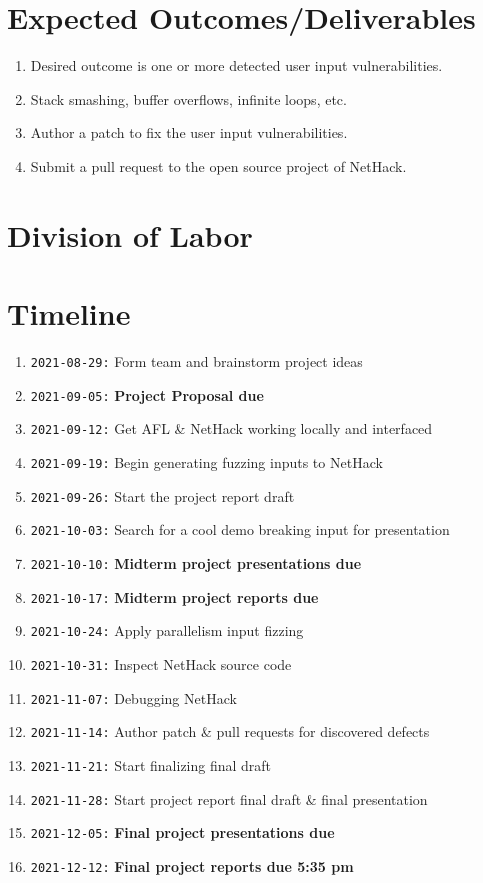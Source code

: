 \documentclass[12pt]{diazessay}
\begin{document}
\section*{Expected Outcomes/Deliverables}

\begin{enumerate}
  \item Desired outcome is one or more detected user input vulnerabilities.
  \item Stack smashing, buffer overflows, infinite loops, etc.
  \item Author a patch to fix the user input vulnerabilities.
  \item Submit a pull request to the open source project of NetHack.
\end{enumerate}


\section*{Division of Labor}


\section*{Timeline}

  \begin{enumerate}[label={}]
  	\item \texttt{2021-08-29:} Form team and brainstorm project ideas
  	\item \texttt{2021-09-05:} \textbf{Project Proposal due}
  	\item \texttt{2021-09-12:} Get AFL \& NetHack working locally and interfaced
 	\item \texttt{2021-09-19:} Begin generating fuzzing inputs to NetHack
  	\item \texttt{2021-09-26:} Start the project report draft
  	\item \texttt{2021-10-03:} Search for a cool demo breaking input for presentation
  	\item \texttt{2021-10-10:} \textbf{Midterm project presentations due}
  	\item \texttt{2021-10-17:} \textbf{Midterm project reports due}
  	\item \texttt{2021-10-24:} Apply parallelism input fizzing
  	\item \texttt{2021-10-31:} Inspect NetHack source code
  	\item \texttt{2021-11-07:} Debugging NetHack
  	\item \texttt{2021-11-14:} Author patch \& pull requests for discovered defects
  	\item \texttt{2021-11-21:} Start finalizing final draft
  	\item \texttt{2021-11-28:} Start project report final draft \& final presentation
  	\item \texttt{2021-12-05:} \textbf{Final project presentations due}
  	\item \texttt{2021-12-12:} \textbf{Final project reports due 5:35 pm}
  \end{enumerate}
\end{document}
